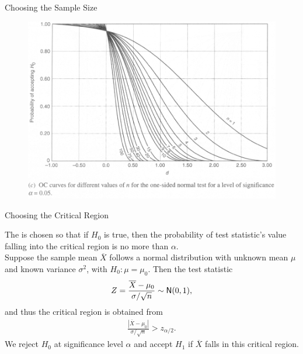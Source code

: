 \begin{frame}{Choosing the Sample Size}

\begin{figure}[htbp]
	\centering
	\includegraphics[width=\linewidth]{./images/rc5fig4.png}
\end{figure}

\end{frame}


\begin{frame}{Choosing the Critical Region}

\justifying
{} The  is chosen so that if $H_0$ is true, then the probability of test statistic's value falling into the critical region is no more than $\alpha$. \\
 Suppose the sample mean $\overline{X}$ follows a normal distribution with unknown mean $\mu$ and known variance $\sigma^2$, with $H_0: \mu = \mu_0$. Then the test statistic
\begin{align*}
Z = \frac{\overline{X} - \mu_0}{\sigma/\sqrt{n}} \sim \mathsf{N}(0, 1),
\end{align*}
and thus the critical region is obtained from
\begin{align*}
\frac{|\overline{X} - \mu_0|}{\sigma/\sqrt{n}} > z_{\alpha/2}.
\end{align*}
We reject $H_0$ at significance level $\alpha$ and accept $H_1$ if $\overline{X}$ falls in this critical region.

\end{frame}


